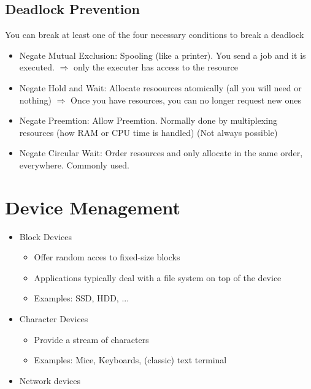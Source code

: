 \documentclass{kit}
\begin{document}
  \subsection{Deadlock Prevention}
    You can break at least one of the four necessary conditions to break a deadlock
    \begin{itemize}
      \item Negate Mutual Exclusion: Spooling (like a printer). You send a job and it is executed. $\Rightarrow$ only the
        executer has access to the resource
      \item Negate Hold and Wait: Allocate resoources atomically (all you will need or nothing) $\Rightarrow$ Once you
        have resources, you can no longer request new ones
      \item Negate Preemtion: Allow Preemtion. Normally done by multiplexing resources (how RAM or CPU time is handled)
        (Not always possible)
      \item Negate Circular Wait: Order resources and only allocate in the same order, everywhere. Commonly used.
    \end{itemize}
\section{Device Menagement}
  \begin{itemize}
    \item Block Devices
      \begin{itemize}
        \item Offer random acces to fixed-size blocks
        \item Applications typically deal with a file system on top of the device
        \item Examples: SSD, HDD, ...
      \end{itemize}
    \item Character Devices
      \begin{itemize}
        \item Provide a stream of characters
        \item Examples: Mice, Keyboards, (classic) text terminal
      \end{itemize}
    \item Network devices
  \end{itemize}
\end{document}
